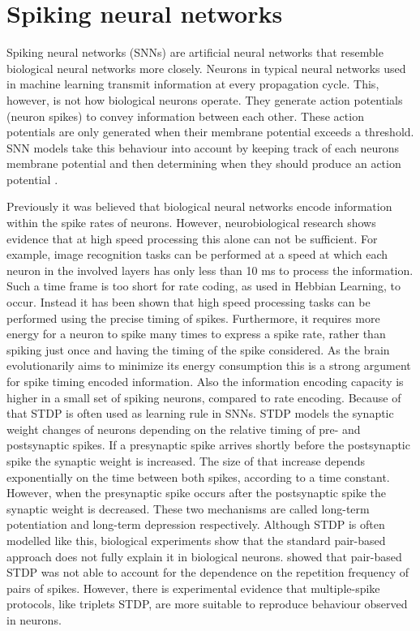 \section{Spiking neural networks}
\label{sec:snn}
Spiking neural networks (SNNs) are artificial neural networks that resemble biological neural networks more closely. Neurons in typical neural networks used in machine learning transmit information at every propagation cycle. This, however, is not how biological neurons operate. They generate action potentials (neuron spikes) to convey information between each other. These action potentials are only generated when their membrane potential exceeds a threshold. SNN models take this behaviour into account by keeping track of each neurons membrane potential and then determining when they should produce an action potential  \citep{SpikingNeuronModelsBook}.

Previously it was believed that biological neural networks encode information within the spike rates of neurons. However, neurobiological research shows evidence that at high speed processing this alone can not be sufficient. For example, image recognition tasks can be performed at a speed at which each neuron in the involved layers has only less than 10 ms to process the information. Such a time frame is too short for rate coding, as used in Hebbian Learning, to occur. Instead it has been shown that high speed processing tasks can be performed using the precise timing of spikes. Furthermore, it requires more energy for a neuron to spike many times to express a spike rate, rather than spiking just once and having the timing of the spike considered. As the brain evolutionarily aims to minimize its energy consumption this is a strong argument for spike timing encoded information. Also the information encoding capacity is higher in a small set of spiking neurons, compared to rate encoding. \citep{LearningInBiologicallyPlausibleSNN}
Because of that STDP is often used as learning rule in SNNs. STDP models the synaptic weight changes of neurons depending on the relative timing of pre- and postsynaptic spikes. If a presynaptic spike arrives shortly before the postsynaptic spike the synaptic weight is increased. The size of that increase depends exponentially on the time between both spikes, according to a time constant. However, when the presynaptic spike occurs after the postsynaptic spike the synaptic weight is decreased. These two mechanisms are called long-term potentiation and long-term depression respectively. Although STDP is often modelled like this, biological experiments show that the standard pair-based approach does not fully explain it in biological neurons. \citep{LearningInBiologicallyPlausibleSNN} 
\citet{triplets} showed that pair-based STDP was not able to account for the dependence on the repetition frequency of pairs of spikes. However, there is experimental evidence that multiple-spike protocols, like triplets STDP, are more suitable to reproduce behaviour observed in neurons.  